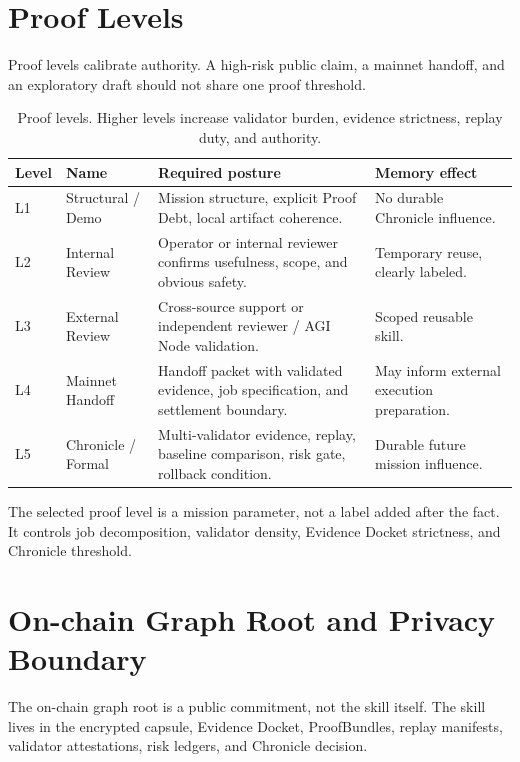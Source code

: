 \documentclass[11pt]{article}
\begin{document}
\section{Proof Levels}
Proof levels calibrate authority. A high-risk public claim, a mainnet handoff, and an exploratory draft should not share one proof threshold.

\begin{table}[h]
\centering
\small
\begin{tabularx}{\textwidth}{@{}p{0.55in}p{1.25in}X p{1.6in}@{}}
\toprule
Level & Name & Required posture & Memory effect \\
\midrule
L1 & Structural / Demo & Mission structure, explicit Proof Debt, local artifact coherence. & No durable Chronicle influence. \\
L2 & Internal Review & Operator or internal reviewer confirms usefulness, scope, and obvious safety. & Temporary reuse, clearly labeled. \\
L3 & External Review & Cross-source support or independent reviewer / AGI Node validation. & Scoped reusable skill. \\
L4 & Mainnet Handoff & Handoff packet with validated evidence, job specification, and settlement boundary. & May inform external execution preparation. \\
L5 & Chronicle / Formal & Multi-validator evidence, replay, baseline comparison, risk gate, rollback condition. & Durable future mission influence. \\
\bottomrule
\end{tabularx}
\caption{Proof levels. Higher levels increase validator burden, evidence strictness, replay duty, and authority.}
\label{tab:prooflevels}
\end{table}

The selected proof level is a mission parameter, not a label added after the fact. It controls job decomposition, validator density, Evidence Docket strictness, and Chronicle threshold.

\section{On-chain Graph Root and Privacy Boundary}
The on-chain graph root is a public commitment, not the skill itself. The skill lives in the encrypted capsule, Evidence Docket, ProofBundles, replay manifests, validator attestations, risk ledgers, and Chronicle decision.
\end{document}
